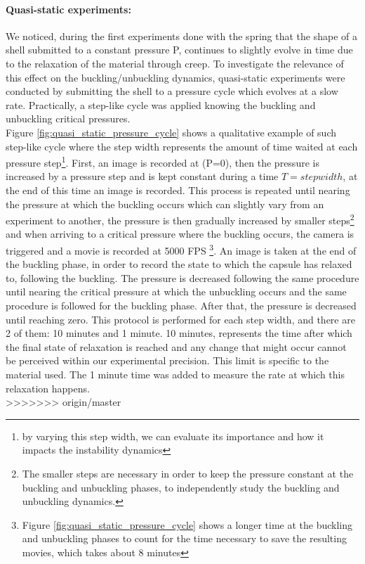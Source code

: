 \paragraph{Quasi-static experiments:}
We noticed, during the first experiments done with the spring that the shape of a shell submitted to a constant pressure P, continues to slightly evolve in time due to the relaxation of the material through creep. To investigate the relevance of this effect on the buckling/unbuckling dynamics, quasi-static experiments were conducted by submitting the shell to a pressure cycle which evolves at a slow rate. Practically, a step-like cycle was applied knowing the buckling and unbuckling critical pressures.\\
Figure \ref{fig:quasi_static_pressure_cycle} shows a qualitative example of such step-like cycle where the step width represents the amount of time waited at each pressure step\footnote{by varying this step width, we can evaluate its importance and how it impacts the instability dynamics}.
First, an image is recorded at (P=0), then the pressure is increased by a pressure step and is kept constant during a time $T=step width$, at the end of this time an image is recorded. This process is repeated until nearing the pressure at which the buckling occurs which can slightly vary from an experiment to another, the pressure is then gradually increased by smaller steps\footnote{The smaller steps are necessary in order to keep the pressure constant at the buckling and unbuckling phases, to independently study the buckling and unbuckling dynamics.}
 and when arriving to a critical pressure where the buckling occurs, the camera is triggered and a movie is recorded at 5000 FPS \footnote{Figure \ref{fig:quasi_static_pressure_cycle} shows a longer time at the buckling and unbuckling phases to count for the time necessary to save the resulting movies, which takes about 8 minutes}. An image is taken at the end of the buckling phase, in order to record the state to which the capsule has relaxed to, following the buckling.
The pressure is decreased following the same procedure until nearing the critical pressure at which the unbuckling occurs and the same procedure is followed for the buckling phase. After that, the pressure is decreased until reaching zero.
This protocol is performed for each step width, and there are 2 of them: 10 minutes and 1 minute. 10 minutes, represents the time after which the final state of relaxation is reached and any change that might occur cannot be perceived within our experimental precision. This limit is specific to the material used. The 1 minute time was added to measure the rate at which this relaxation happens.\\
>>>>>>> origin/master
   
